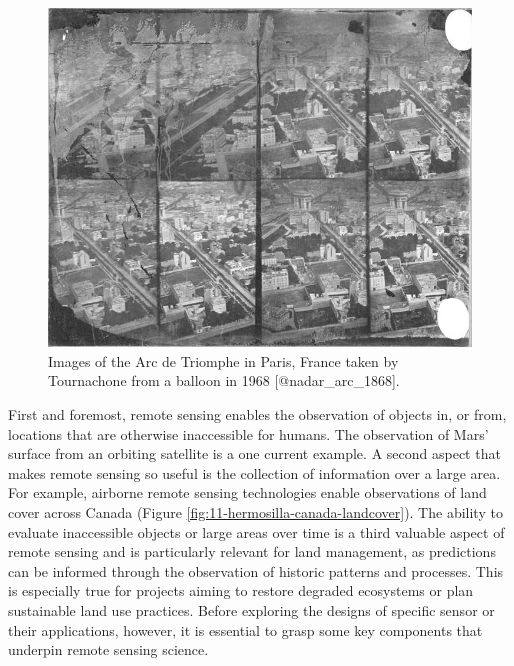 \documentclass[
]{book}
\begin{document}
\begin{figure}
\includegraphics[width=0.75\linewidth]{images/11-nadar-triomphe-1868} \caption{Images of the Arc de Triomphe in Paris, France taken by Tournachone from a balloon in 1968 [@nadar_arc_1868].}\label{fig:11-nadar}
\end{figure}

First and foremost, remote sensing enables the observation of objects
in, or from, locations that are otherwise inaccessible for humans. The
observation of Mars' surface from an orbiting satellite is a one current
example. A second aspect that makes remote sensing so useful is the
collection of information over a large area. For example, airborne
remote sensing technologies enable observations of land cover across
Canada (Figure \ref{fig:11-hermosilla-canada-landcover}). The ability
to evaluate inaccessible objects or large areas over time is a third
valuable aspect of remote sensing and is particularly relevant for land
management, as predictions can be informed through the observation of
historic patterns and processes. This is especially true for projects
aiming to restore degraded ecosystems or plan sustainable land use
practices. Before exploring the designs of specific sensor or their
applications, however, it is essential to grasp some key components that
underpin remote sensing science.
\end{document}
